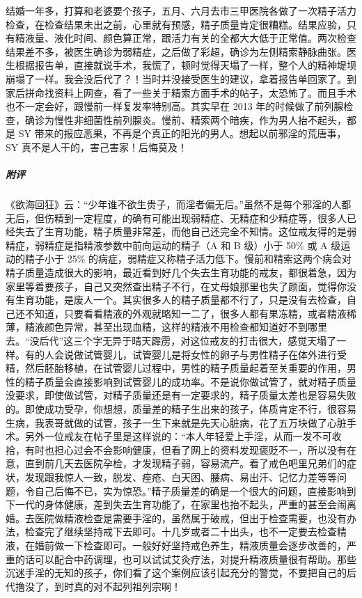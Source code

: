 \begin{case}
    结婚一年多，打算和老婆要个孩子，五月、六月去市三甲医院各做了一次精子活力检查，在检查结果未出之前，心里就有预感，精子质量肯定很糟糕。结果应验，只有精液量、液化时间、颜色算正常，跟活力有关的全都大大低于正常值。两次检查结果差不多，被医生确诊为弱精症，之后做了彩超，确诊为左侧精索静脉曲张。医生根据报告单，直接就说手术，我慌了，顿时觉得天塌了一样，整个人的精神堤坝崩塌了一样。我会没后代了？！当时并没接受医生的建议，拿着报告单回家了。到家后拼命找资料上网查，看了一些关于精索方面手术的帖子，太恐怖了。而且手术也不一定会好，跟慢前一样复发率特别高。其实早在 2013 年的时候做了前列腺检查，确诊为慢性非细菌性前列腺炎。慢前、精索两个暗疾，作为男人抬不起头，都是 SY 带来的报应恶果，不再是个真正的阳光的男人。想起以前邪淫的荒唐事，SY 真不是人干的，害己害家！后悔莫及！
    \subparagraph{附评} 《欲海回狂》云：“少年谁不欲生贵子，而淫者偏无后。”虽然不是每个邪淫的人都无后，但伤精到一定程度，的确有可能出现弱精症、无精症和少精症等，很多人已经失去了生育功能，精子质量非常差，而他自己还完全不知情。这位戒友得的是弱精症，弱精症是指精液参数中前向运动的精子（A 和 B 级）小于 50\% 或 A 级运动的精子小于 25\% 的病症，弱精症又称精子活力低下。慢前和精索这两个病会对精子质量造成很大的影响，最近看到好几个失去生育功能的戒友，都很着急，因为家里等着要孩子，自己又突然查出精子不行，在丈母娘那里也失了颜面，觉得你没有生育功能，是废人一个。其实很多人的精子质量都不行了，只是没有去检查，自己还不知道，只要看看精液的外观就略知一二了，很多人都有果冻精，或者精液稀薄，精液颜色异常，甚至出现血精，这样的精液不用检查都知道好不到哪里去。“没后代”这三个字无异于晴天霹雳，对这位戒友的打击很大，感觉天塌了一样。有的人会说做试管婴儿，试管婴儿是将女性的卵子与男性精子在体外进行受精，然后胚胎移植，在试管婴儿过程中，男性的精子质量起着至关重要的作用，男性的精子质量会直接影响到试管婴儿的成功率。不是说你做试管了，就对精子质量没要求，即使做试管，对精子质量还是有一定要求的，精子质量太差也是容易失败的。即使成功受孕，你想想，质量差的精子生出来的孩子，体质肯定不行，很容易生病，我表哥就做的试管，孩子一生下来就是先天心脏病，花了五万块做了心脏手术。另外一位戒友在帖子里是这样说的：“本人年轻爱上手淫，从而一发不可收拾，有时也担心过会不会影响健康，但看了网上的资料发现褒贬不一，所以没有在意，直到前几天去医院孕检，才发现精子弱，容易流产。看了戒色吧里兄弟们的症状，发现跟我惊人一致，脱发、痤疮、白天困、腰病、易出汗、记忆力差等等问题，令自己后悔不已，实为惊恐。”精子质量差的确是一个很大的问题，直接影响到下一代的身体健康，差到失去生育功能了，在家里也抬不起头，严重的甚至会闹离婚。去医院做精液检查是需要手淫的，虽然属于破戒，但出于检查需要，也没有办法，检查完了继续坚持戒下去即可。十几岁或者二十出头，也不一定要去检查精液，在婚前做一下检查即可。一般好好坚持戒色养生，精液质量会逐步改善的，严重的话可以配合中药调理，也可以试试艾灸疗法，对提升精液质量很有帮助。那些沉迷手淫的无知的孩子，你们看了这个案例应该引起充分的警觉，不要把自己的后代撸没了，到时真的对不起列祖列宗啊！
\end{case}

